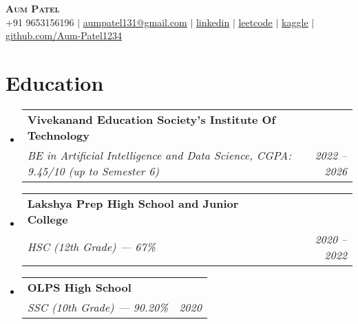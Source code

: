 \documentclass[letterpaper,11pt]{article}
\makeatletter
\newcommand{\resumeItem}[1]{
  \item\small{
    {#1 \vspace{-2pt}}
  }
}
\newcommand{\resumeSubheading}[4]{
  \vspace{-2pt}\item
    \begin{tabular*}{0.97\textwidth}[t]{l@{\extracolsep{\fill}}r}
      \textbf{#1} & #2 \\
      \textit{\small#3} & \textit{\small #4} \\
    \end{tabular*}\vspace{-7pt}
}
\newcommand{\resumeSubHeadingListStart}{\begin{itemize}[leftmargin=0.15in, label={}]}
\newcommand{\resumeSubHeadingListEnd}{\end{itemize}}
\newcommand{\resumeItemListStart}{\begin{itemize}}
\newcommand{\resumeItemListEnd}{\end{itemize}\vspace{-5pt}}
\makeatother
\begin{document}

\begin{center}
    \textbf{\Huge \scshape Aum Patel} \\ \vspace{1pt}
    \small +91 9653156196 $|$ \href{mailto:aumpatel131@gmail.com}{\underline{aumpatel131@gmail.com}} $|$ 
    \href{https://www.linkedin.com/in/aumpatel131/}{\underline{linkedin}} $|$
    \href{https://leetcode.com/u/Aum-Jayraj-Patel/}{\underline{leetcode}} $|$
    \href{https://www.kaggle.com/aumpatel131}{\underline{kaggle}} $|$
    \href{https://github.com/Aum-Patel1234}{\underline{github.com/Aum-Patel1234}}
\end{center}


\section{Education}
  \resumeSubHeadingListStart
    \resumeSubheading
      {Vivekanand Education Society's Institute Of Technology}{} 
      {BE in Artificial Intelligence and Data Science, CGPA: 9.45/10 (up to Semester 6)}{2022 -- 2026}
    \resumeSubheading
      {Lakshya Prep High School and Junior College}{} 
      {HSC (12th Grade) — 67\%}{2020 -- 2022}
    \resumeSubheading
      {OLPS High School}{} 
      {SSC (10th Grade) — 90.20\%}{2020}
\resumeSubHeadingListEnd




      
\end{document}
